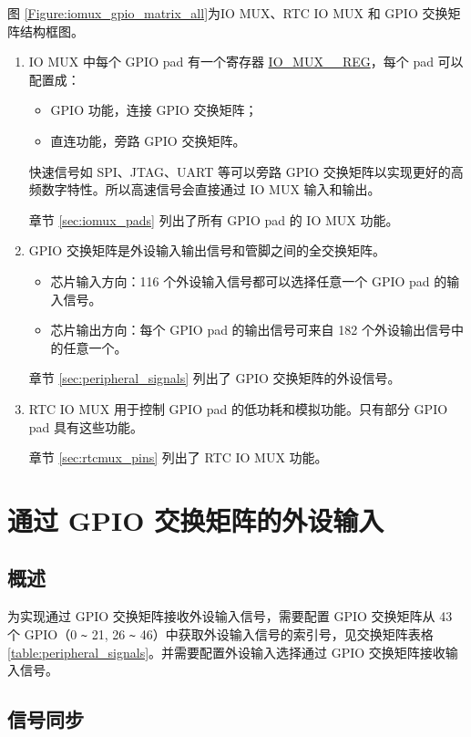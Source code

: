 \documentclass[main\_\_CN.tex]{subfiles}
\begin{document}
图 \ref{Figure:iomux_gpio_matrix_all}为IO MUX、RTC IO MUX 和 GPIO 交换矩阵结构框图。

\begin{enumerate}

\item IO MUX 中每个 GPIO pad 有一个寄存器 \hyperref[regdesc:IOMUXnREG]{IO\_MUX\_\_REG}，每个 pad 可以配置成：
\begin{itemize}
    \item GPIO 功能，连接 GPIO 交换矩阵；
    \item 直连功能，旁路 GPIO 交换矩阵。
\end{itemize}
快速信号如 SPI、JTAG、UART 等可以旁路 GPIO 交换矩阵以实现更好的高频数字特性。所以高速信号会直接通过 IO MUX 输入和输出。

章节 \ref{sec:iomux_pads} 列出了所有 GPIO pad 的 IO MUX 功能。

\item GPIO 交换矩阵是外设输入输出信号和管脚之间的全交换矩阵。
\begin{itemize}
\item 芯片输入方向：116 个外设输入信号都可以选择任意一个 GPIO pad 的输入信号。
\item 芯片输出方向：每个 GPIO pad 的输出信号可来自 182 个外设输出信号中的任意一个。
\end{itemize}

章节 \ref{sec:peripheral_signals} 列出了 GPIO 交换矩阵的外设信号。

\item RTC IO MUX 用于控制 GPIO pad 的低功耗和模拟功能。只有部分 GPIO pad 具有这些功能。

章节 \ref{sec:rtcmux_pins} 列出了 RTC IO MUX 功能。
\end{enumerate}

\section{通过 GPIO 交换矩阵的外设输入}


\subsection{概述}

为实现通过 GPIO 交换矩阵接收外设输入信号，需要配置 GPIO 交换矩阵从 43 个 GPIO（0 \verb+~+ 21, 26 \verb+~+ 46）中获取外设输入信号的索引号，见交换矩阵表格 \ref{table:peripheral_signals}。并需要配置外设输入选择通过 GPIO 交换矩阵接收输入信号。


\subsection{信号同步}
\label{sec:inputconfig}
\end{document}
